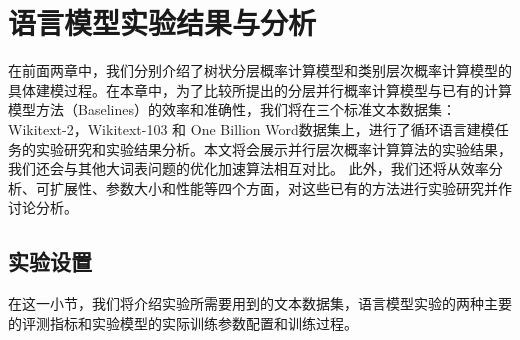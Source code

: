 
\chapter{语言模型实验结果与分析}
在前面两章中，我们分别介绍了树状分层概率计算模型和类别层次概率计算模型的具体建模过程。在本章中，为了比较所提出的分层并行概率计算模型与已有的计算模型方法（Baselines）的效率和准确性，我们将在三个标准文本数据集：Wikitext-2，Wikitext-103 和 One Billion Word数据集上，进行了循环语言建模任务的实验研究和实验结果分析。本文将会展示并行层次概率计算算法的实验结果，我们还会与其他大词表问题的优化加速算法相互对比。 此外，我们还将从效率分析、可扩展性、参数大小和性能等四个方面，对这些已有的方法进行实验研究并作讨论分析。

\section{实验设置}
在这一小节，我们将介绍实验所需要用到的文本数据集，语言模型实验的两种主要的评测指标和实验模型的实际训练参数配置和训练过程。
